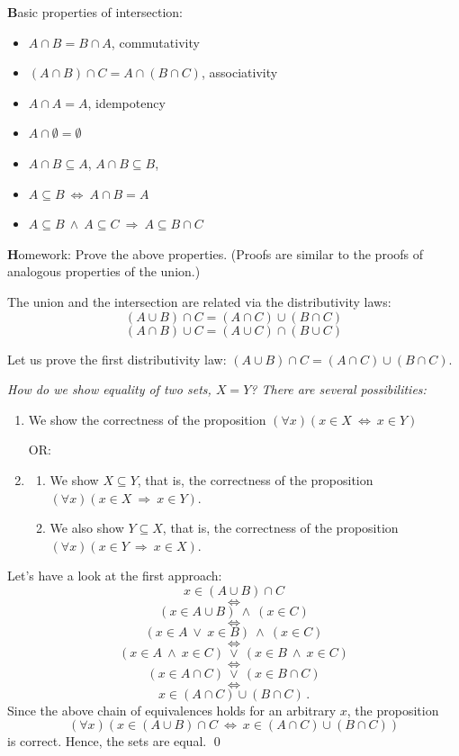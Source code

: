 \documentclass[11pt,paper=b5,footinclude,headinclude]{scrbook} %
\def\ali {{~\vee~}}
\def\inn {{~\wedge~}}
\def\sledi {{~\Rightarrow~}}
\def\cee {{~\Leftrightarrow~}}
\theoremstyle{remark}
\theoremstyle{definition} %
\begin{document}
\bigskip
{\textbf Basic properties of intersection:}
\begin{itemize}
  \item $A\cap B = B\cap A$, commutativity
  \item $(A\cap B)\cap C = A\cap (B\cap C)$, associativity
  \item $A\cap A = A$, idempotency
  \item $A\cap \emptyset = \emptyset$
  \item $A\cap B\subseteq A$, $A\cap B\subseteq B$,
  \item $A\subseteq B\cee A\cap B = A$
  \item $A\subseteq B\inn A\subseteq C\sledi A \subseteq B\cap C$
\end{itemize}

\bigskip
{\textbf Homework:} Prove the above properties. (Proofs are similar to the proofs of analogous properties of the union.)

\bigskip
The union and the intersection are related via the distributivity laws:
$$(A\cup B)\cap C = (A\cap C)\cup (B\cap C)$$
$$(A\cap B)\cup C = (A\cup C)\cap (B\cup C)$$

Let us prove the first distributivity law:
$(A\cup B)\cap C = (A\cap C)\cup (B\cap C)$.

{\em How do we show equality of two sets, $X = Y$? There are several possibilities:
\begin{enumerate}
  \item We show the correctness of the proposition $(\forall x)(x\in X\cee x\in Y)$

  OR:
  \item

  \begin{enumerate}
          \item   We show $X\subseteq Y$, that is, the correctness of the proposition $(\forall x)(x\in X\sledi x\in Y)$.
          \item   We also show $Y\subseteq X$, that is, the correctness of the proposition $(\forall x)(x\in Y\sledi x\in X)$.
        \end{enumerate}
\end{enumerate}}
Let's have a look at the first approach:
$$x\in (A\cup B)\cap C$$
$$\cee$$
$$(x\in A\cup B) \inn (x\in C)$$
$$\cee$$
$$(x\in A\ali x\in B) \inn (x\in C)$$
$$\cee$$
$$(x\in A \inn  x\in C)\ali (x\in B \inn  x\in C) $$
$$\cee$$
$$(x\in A \cap C)\ali (x\in B \cap C) $$
$$\cee$$
$$x\in (A \cap C)\cup (B \cap C)\,.$$
Since the above chain of equivalences holds for an arbitrary $x$, the proposition
$$(\forall x)(x\in (A\cup B)\cap C\cee x\in (A \cap C)\cup (B \cap C))$$
is correct. Hence, the sets are equal.
\qed
\end{document}

